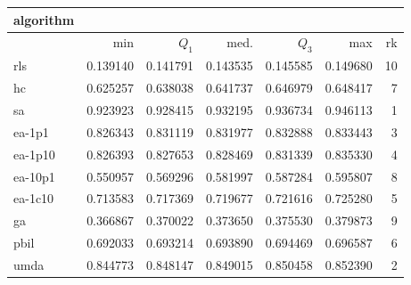 \begin{tabular}{@{}l*{5}{>{{}}N{1}{3}}>{{}}N{2}{0}@{}}
\toprule
{algorithm} &  \\
\midrule
& {min} & {$Q_1$} & {med.} & {$Q_3$} & {max} & {rk}\\
\midrule
rls & 0.139140 & 0.141791 & 0.143535 & 0.145585 & 0.149680 & 10\\
hc & 0.625257 & 0.638038 & 0.641737 & 0.646979 & 0.648417 & 7\\
sa & {\color{blue}} 0.923923 & {\color{blue}} 0.928415 & {\color{blue}} 0.932195 & {\color{blue}} 0.936734 & {\color{blue}} 0.946113 & 1\\
ea-1p1 & 0.826343 & 0.831119 & 0.831977 & 0.832888 & 0.833443 & 3\\
ea-1p10 & 0.826393 & 0.827653 & 0.828469 & 0.831339 & 0.835330 & 4\\
ea-10p1 & 0.550957 & 0.569296 & 0.581997 & 0.587284 & 0.595807 & 8\\
ea-1c10 & 0.713583 & 0.717369 & 0.719677 & 0.721616 & 0.725280 & 5\\
ga & 0.366867 & 0.370022 & 0.373650 & 0.375530 & 0.379873 & 9\\
pbil & 0.692033 & 0.693214 & 0.693890 & 0.694469 & 0.696587 & 6\\
umda & 0.844773 & 0.848147 & 0.849015 & 0.850458 & 0.852390 & 2\\
\bottomrule
\end{tabular}
